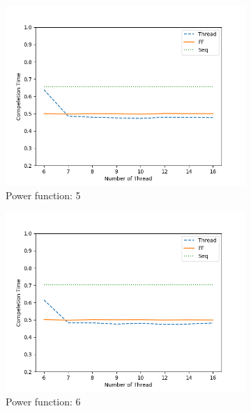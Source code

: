 \documentclass[runningheads,a4paper]{llncs}
\begin{document}
\begin{figure}[t!]
	\centering
	\begin{subfigure}[b]{0.3\textwidth}
		\includegraphics[scale = 0.3]{image/graph/input100/pow05}
		\caption{Power function: 5}
	\end{subfigure}
	\begin{subfigure}[b]{0.3\textwidth}
		\includegraphics[scale = 0.3]{image/graph/input100/pow06}
		\caption{Power function: 6}
	\end{subfigure}
	\begin{subfigure}[b]{0.3\textwidth}

\end{subfigure}
\end{figure}
\end{document}
